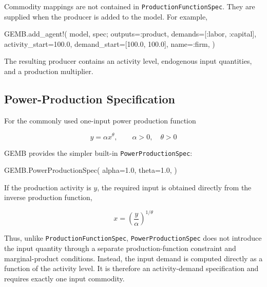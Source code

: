 \documentclass[
  letterpaper,
  DIV=11,
  numbers=noendperiod]{scrreprt}
\newenvironment{Shaded}{\begin{snugshade}}{\end{snugshade}}
\newcommand{\FloatTok}[1]{\textcolor[rgb]{0.68,0.00,0.00}{#1}}
\newcommand{\FunctionTok}[1]{\textcolor[rgb]{0.28,0.35,0.67}{#1}}
\newcommand{\NormalTok}[1]{\textcolor[rgb]{0.00,0.23,0.31}{#1}}
\newcommand{\OperatorTok}[1]{\textcolor[rgb]{0.37,0.37,0.37}{#1}}
\begin{document}
Commodity mappings are not contained in \texttt{ProductionFunctionSpec}.
They are supplied when the producer is added to the model. For example,

\begin{Shaded}
\begin{Highlighting}[]
\NormalTok{GEMB.}\FunctionTok{add\_agent!}\NormalTok{(}
\NormalTok{    model,}
\NormalTok{    spec;}
\NormalTok{    outputs}\OperatorTok{=:}\NormalTok{product,}
\NormalTok{    demands}\OperatorTok{=}\NormalTok{[}\OperatorTok{:}\NormalTok{labor, }\OperatorTok{:}\NormalTok{capital],}
\NormalTok{    activity\_start}\OperatorTok{=}\FloatTok{100.0}\NormalTok{,}
\NormalTok{    demand\_start}\OperatorTok{=}\NormalTok{[}\FloatTok{100.0}\NormalTok{, }\FloatTok{100.0}\NormalTok{],}
\NormalTok{    name}\OperatorTok{=:}\NormalTok{firm,}
\NormalTok{)}
\end{Highlighting}
\end{Shaded}

The resulting producer contains an activity level, endogenous input
quantities, and a production multiplier.

\subsection{Power-Production
Specification}\label{power-production-specification}

For the commonly used one-input power production function

\[
y=\alpha x^\theta,
\qquad
\alpha>0,\quad\theta>0
\]

GEMB provides the simpler built-in \texttt{PowerProductionSpec}:

\begin{Shaded}
\begin{Highlighting}[]
\NormalTok{GEMB.}\FunctionTok{PowerProductionSpec}\NormalTok{(}
\NormalTok{    alpha}\OperatorTok{=}\FloatTok{1.0}\NormalTok{,}
\NormalTok{    theta}\OperatorTok{=}\FloatTok{1.0}\NormalTok{,}
\NormalTok{)}
\end{Highlighting}
\end{Shaded}

If the production activity is \(y\), the required input is obtained
directly from the inverse production function,

\[
x
=
\left(
\frac{y}{\alpha}
\right)^{1/\theta}
\]

Thus, unlike \texttt{ProductionFunctionSpec},
\texttt{PowerProductionSpec} does not introduce the input quantity
through a separate production-function constraint and marginal-product
conditions. Instead, the input demand is computed directly as a function
of the activity level. It is therefore an activity-demand specification
and requires exactly one input commodity.
\end{document}
